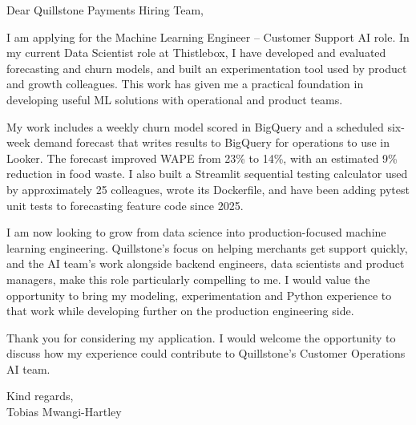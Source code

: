 \documentclass[11pt,a4paper]{article}
\begin{document}
Dear Quillstone Payments Hiring Team,

I am applying for the Machine Learning Engineer -- Customer Support AI role. In my current Data Scientist role at Thistlebox, I have developed and evaluated forecasting and churn models, and built an experimentation tool used by product and growth colleagues. This work has given me a practical foundation in developing useful ML solutions with operational and product teams.

My work includes a weekly churn model scored in BigQuery and a scheduled six-week demand forecast that writes results to BigQuery for operations to use in Looker. The forecast improved WAPE from 23\% to 14\%, with an estimated 9\% reduction in food waste. I also built a Streamlit sequential testing calculator used by approximately 25 colleagues, wrote its Dockerfile, and have been adding pytest unit tests to forecasting feature code since 2025.

I am now looking to grow from data science into production-focused machine learning engineering. Quillstone’s focus on helping merchants get support quickly, and the AI team’s work alongside backend engineers, data scientists and product managers, make this role particularly compelling to me. I would value the opportunity to bring my modeling, experimentation and Python experience to that work while developing further on the production engineering side.

Thank you for considering my application. I would welcome the opportunity to discuss how my experience could contribute to Quillstone’s Customer Operations AI team.

Kind regards,\\
Tobias Mwangi-Hartley
\end{document}

